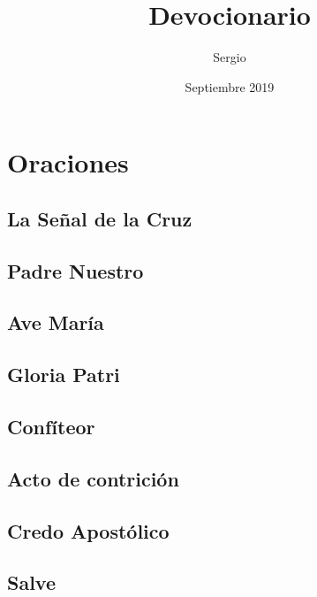 \documentclass[11pt,a4paper]{report}
\title{Devocionario}
\author{Sergio}
\date{Septiembre 2019}
\begin{document}
    \maketitle

    \section*{Oraciones}

    \subsection*{La Señal de la Cruz}
    

    \subsection*{Padre Nuestro}
    

    \subsection*{Ave María}
    

    \subsection*{Gloria Patri}
    

    \subsection*{Confíteor}
    

    \subsection*{Acto de contrición}
    

    \subsection*{Credo Apostólico}
    

    \subsection*{Salve}
    
\end{document}
